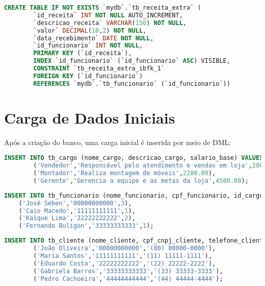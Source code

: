 \documentclass[
12pt,
a4paper,
semrecuonosumario,
sumario = abnt-6027-2012]{report}
\begin{document}
    \begin{lstlisting}[language=SQL,caption={DDL -- Tabela \texttt{tb\_receita\_extra}}]
    	CREATE TABLE IF NOT EXISTS `mydb`.`tb_receita_extra` (
    	`id_receita` INT NOT NULL AUTO_INCREMENT,
    	`descricao_receita` VARCHAR(150) NOT NULL,
    	`valor` DECIMAL(10,2) NOT NULL,
    	`data_recebimento` DATE NOT NULL,
    	`id_funcionario` INT NOT NULL,
    	PRIMARY KEY (`id_receita`),
    	INDEX `id_funcionario` (`id_funcionario` ASC) VISIBLE,
    	CONSTRAINT `tb_receita_extra_ibfk_1`
    	FOREIGN KEY (`id_funcionario`)
    	REFERENCES `mydb`.`tb_funcionario` (`id_funcionario`))
    \end{lstlisting}

    \section{Carga de Dados Iniciais}\label{sec:carga}
    Após a criação do banco, uma carga inicial é inserida por meio de DML:
    
    \begin{lstlisting}[language=SQL,caption={DML -- Tabela \texttt{tb\_cargo}}]
        INSERT INTO tb_cargo (nome_cargo, descricao_cargo, salario_base) VALUES
        ('Vendedor','Responsável pelo atendimento e vendas em loja',2000.00),
        ('Montador','Realiza montagem de móveis',2200.00),
        ('Gerente','Gerencia a equipe e as metas da loja',4500.00);
    \end{lstlisting}
    \begin{lstlisting}[language=SQL,caption={DML -- Tabela \texttt{tb\_funcionario}}]
    INSERT INTO tb_funcionario (nome_funcionario, cpf_funcionario, id_cargo) VALUES
    ('José Seben','00000000000',3),
    ('Caio Macedo','11111111111',1),
    ('Kaique Lima','22222222222',2),
    ('Fernando Buligon','33333333333',1);
    \end{lstlisting}
    
    \begin{lstlisting}[language=SQL,caption={DML -- Tabela \texttt{tb\_cliente}}]
        INSERT INTO tb_cliente (nome_cliente, cpf_cnpj_cliente, telefone_cliente) VALUES
        ('João Oliveira','00000000000','(00) 00000-0000'),
        ('Maria Santos','11111111111','(11) 11111-1111'),
        ('Eduardo Costa','22222222222','(22) 22222-2222'),
        ('Gabriela Barros','33333333333','(33) 33333-3333'),
        ('Pedro Cachoeira','44444444444','(44) 44444-4444');
    \end{lstlisting}
    
\end{document}
